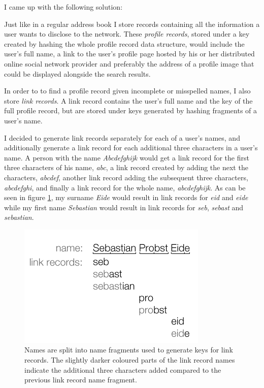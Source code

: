 I came up with the following solution:

Just like in a regular address book I store records containing all the information a user wants to disclose to the network. These \emph{profile records}, stored under a key created by hashing the whole profile record data structure, would include the user's full name, a link to the user's profile page hosted by his or her distributed online social network provider and preferably the address of a profile image that could be displayed alongside the search results.

In order to to find a profile record given incomplete or misspelled names, I also store \emph{link records}. A link record contains the user's full name and the key of the full profile record, but are stored under keys generated by hashing fragments of a user's name. 

I decided to generate link records separately for each of a user's names, and additionally generate a link record for each additional three characters in a user's name. A person with the name \emph{Abcdefghijk} would get a link record for the first three characters of his name, \emph{abc}, a link record created by adding the next the characters, \emph{abcdef}, another link record adding the subsequent three characters, \emph{abcdefghi}, and finally a link record for the whole name, \emph{abcdefghijk}.
As can be seen in figure \ref{figLinkRecord}, my surname \emph{Eide} would result in link records for \emph{eid} and \emph{eide} while my first name \emph{Sebastian} would result in link records for \emph{seb}, \emph{sebast} and \emph{sebastian}.

\begin{figure}[!htb]
\begin{center}
	\includegraphics[width=0.6\linewidth]{illustrations/LinkRecords.png}
  \caption{Names are split into name fragments used to generate keys for link records. The slightly darker coloured parts of the link record names indicate the additional three characters added compared to the previous link record name fragment.}
  \label{figLinkRecord}
\end{center}
\end{figure}

